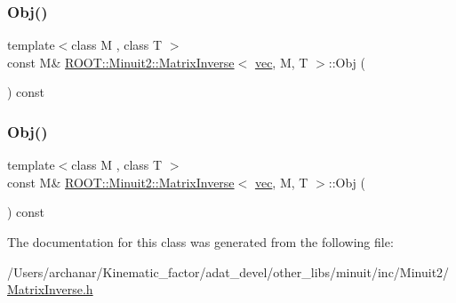 \subsubsection{\texorpdfstring{Obj()}{Obj()}\hspace{0.1cm}{\footnotesize\ttfamily [1/2]}}
{\footnotesize\ttfamily template$<$class M , class T $>$ \\
const M\& \mbox{\hyperlink{classROOT_1_1Minuit2_1_1MatrixInverse}{R\+O\+O\+T\+::\+Minuit2\+::\+Matrix\+Inverse}}$<$ \mbox{\hyperlink{classROOT_1_1Minuit2_1_1vec}{vec}}, M, T $>$\+::Obj (\begin{DoxyParamCaption}{ }\end{DoxyParamCaption}) const\hspace{0.3cm}{\ttfamily [inline]}}

\mbox{\label{classROOT_1_1Minuit2_1_1MatrixInverse_3_01vec_00_01M_00_01T_01_4_a9d034050e7fbadfbbf24613a54c8ed93}} 
\subsubsection{\texorpdfstring{Obj()}{Obj()}\hspace{0.1cm}{\footnotesize\ttfamily [2/2]}}
{\footnotesize\ttfamily template$<$class M , class T $>$ \\
const M\& \mbox{\hyperlink{classROOT_1_1Minuit2_1_1MatrixInverse}{R\+O\+O\+T\+::\+Minuit2\+::\+Matrix\+Inverse}}$<$ \mbox{\hyperlink{classROOT_1_1Minuit2_1_1vec}{vec}}, M, T $>$\+::Obj (\begin{DoxyParamCaption}{ }\end{DoxyParamCaption}) const\hspace{0.3cm}{\ttfamily [inline]}}



The documentation for this class was generated from the following file\+:\begin{DoxyCompactItemize}
\item 
/\+Users/archanar/\+Kinematic\+\_\+factor/adat\+\_\+devel/other\+\_\+libs/minuit/inc/\+Minuit2/\mbox{\hyperlink{other__libs_2minuit_2inc_2Minuit2_2MatrixInverse_8h}{Matrix\+Inverse.\+h}}\end{DoxyCompactItemize}
